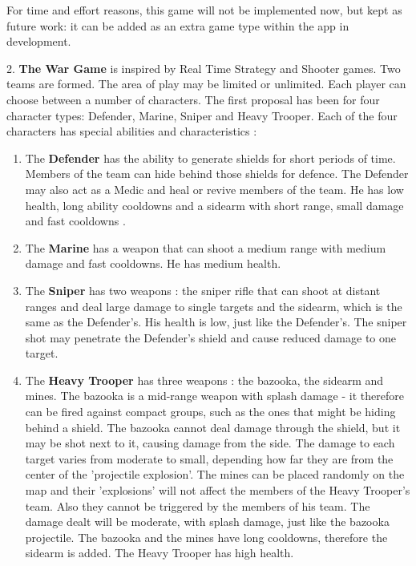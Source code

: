 \documentclass{article}
\begin{document}
For time and effort reasons, this game will not be implemented now, but kept as
future work: it can be added as an extra game type within the app in
development.\newline

2. \textbf{The War Game} is inspired by Real Time Strategy and Shooter games.
Two teams are formed. The area of play may be limited or unlimited. Each
player can choose between a number of characters. The first proposal has been
for four character types: Defender, Marine, Sniper and Heavy Trooper. Each of
the four characters has special abilities and characteristics :
\begin{enumerate}
	
	\item The \textbf{Defender} has the ability to generate shields for short
	periods of time. Members of the team can hide behind those shields for defence.
	The Defender may also act as a Medic and heal or revive members of the team. He
	has low health, long ability cooldowns and a sidearm with short range, small
	damage and fast cooldowns .
	
	\item The \textbf{Marine} has a weapon that can shoot a medium range with
	medium damage and fast cooldowns. He has medium health. 
	
	\item The \textbf{Sniper} has two weapons : the sniper rifle that can shoot at
	distant ranges and deal large damage to single targets and the sidearm, which
	is the same as the Defender's. His health is low, just like the Defender's. The
	sniper shot may penetrate the Defender's shield and cause reduced damage to one
	target.	
	
	\item The \textbf{Heavy Trooper} has three weapons : the bazooka, the sidearm
	and mines. The bazooka is a mid-range weapon with splash damage - it therefore
	can be fired against compact groups, such as the ones that might be hiding
	behind a shield. The bazooka cannot deal damage through the shield, but it may
	be shot next to it, causing damage from the side. The damage to each target
	varies from moderate to small, depending how far they are from the center of
	the 'projectile explosion'. The mines can be placed randomly on the map and
	their 'explosions' will not affect the members of the Heavy Trooper's team.
	Also they cannot be triggered by the members of his team. The damage dealt will
	be moderate, with splash damage, just like the bazooka projectile. The bazooka
	and the mines have long cooldowns, therefore the sidearm is added. The Heavy
	Trooper has high health.
	 
\end{enumerate}
\end{document}
